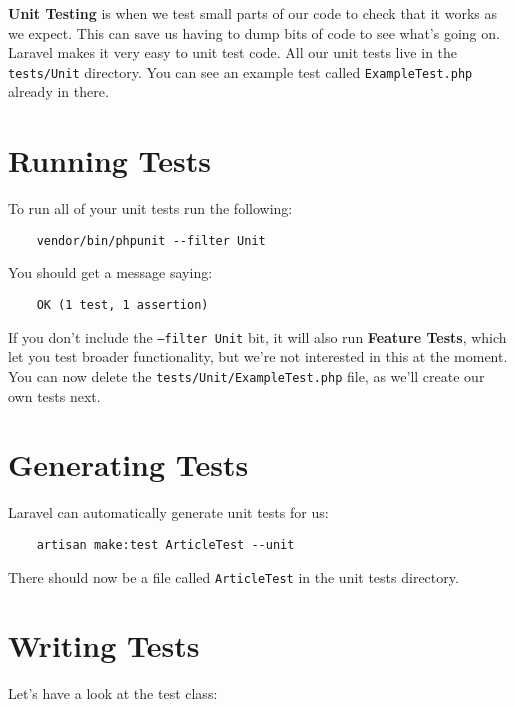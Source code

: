 \textbf{Unit Testing} is when we test small parts of our code to check that it works as we expect. This can save us having to dump bits of code to see what's going on.
\\

Laravel makes it very easy to unit test code. All our unit tests live in the \texttt{tests/Unit} directory. You can see an example test called \texttt{ExampleTest.php} already in there.

\section{Running Tests}

To run all of your unit tests run the following:

\begin{verbatim}
    vendor/bin/phpunit --filter Unit
\end{verbatim}

You should get a message saying:

\begin{verbatim}
    OK (1 test, 1 assertion)
\end{verbatim}

If you don't include the \texttt{--filter Unit} bit, it will also run \textbf{Feature Tests}, which let you test broader functionality, but we're not interested in this at the moment.
\\

You can now delete the \texttt{tests/Unit/ExampleTest.php} file, as we'll create our own tests next.


\section{Generating Tests}

Laravel can automatically generate unit tests for us:

\begin{verbatim}
    artisan make:test ArticleTest --unit
\end{verbatim}

There should now be a file called \texttt{ArticleTest} in the unit tests directory.


\section{Writing Tests}

Let's have a look at the test class:

